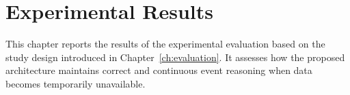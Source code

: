 \chapter{Experimental Results}\label{ch:results}
This chapter reports the results of the experimental evaluation based on the study design introduced in Chapter~\ref{ch:evaluation}. It assesses how the proposed architecture maintains correct and continuous event reasoning when data becomes temporarily unavailable. 